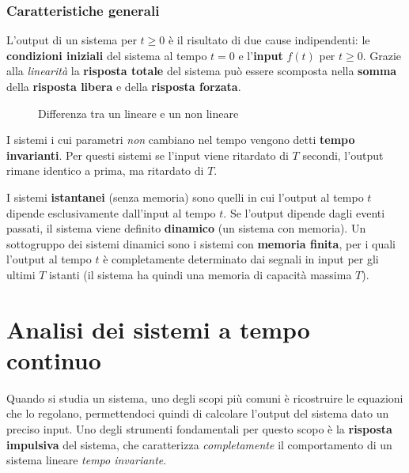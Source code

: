 \documentclass[a4paper, titlepage, oneside]{scrbook}
\begin{document}
\subsection{Caratteristiche generali}
L'output di un sistema per $t\geq0$ è il risultato di due cause indipendenti: le \textbf{condizioni iniziali} del sistema al tempo $t=0$ e l'\textbf{input} $f(t)$ per $t\geq0$.
Grazie alla \textit{linearità} la \textbf{risposta totale} del sistema può essere scomposta nella \textbf{somma} della \textbf{risposta libera} e della \textbf{risposta forzata}.
\begin{figure}[h]
	\centering
	\caption{Differenza tra un lineare e un non lineare}
	\label{fig:lineare_vs_nonlineare}
\end{figure}

I sistemi i cui parametri \textit{non} cambiano nel tempo vengono detti \textbf{tempo invarianti}.
Per questi sistemi se l'input viene ritardato di $T$ secondi, l'output rimane identico a prima, ma ritardato di $T$.

I sistemi \textbf{istantanei} (senza memoria) sono quelli in cui l'output al tempo $t$ dipende esclusivamente dall'input al tempo $t$.
Se l'output dipende dagli eventi passati, il sistema viene definito \textbf{dinamico} (un sistema con memoria).
Un sottogruppo dei sistemi dinamici sono i sistemi con \textbf{memoria finita}, per i quali l'output al tempo $t$ è completamente determinato
dai segnali in input per gli ultimi $T$ istanti (il sistema ha quindi una memoria di capacità massima $T$).

\chapter{Analisi dei sistemi a tempo continuo}
Quando si studia un sistema, uno degli scopi più comuni è ricostruire le equazioni che lo regolano, permettendoci quindi di calcolare l'output del sistema dato un preciso input.
Uno degli strumenti fondamentali per questo scopo è la \textbf{risposta impulsiva} del sistema, che caratterizza \textit{completamente} il comportamento di un sistema lineare \textit{tempo invariante}.
\end{document}

